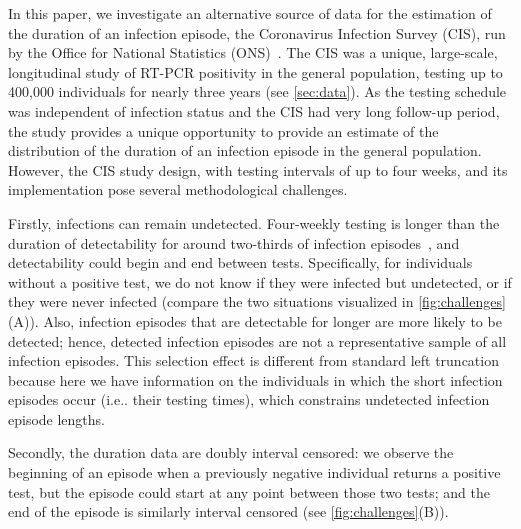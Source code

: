 \documentclass[referee,useAMS,usenatbib]{biom}
\makeatletter
\DeclareRobustCommand\onedot{\futurelet\@let@token\@onedot}
\def\@onedot{\ifx\@let@token.\else.\null\fi\xspace}
\def\ie{i.e\onedot} \def\Ie{{I.e}\onedot}
\makeatother
\begin{document}
In this paper, we investigate an alternative source of data for the estimation of the duration of an infection episode, the Coronavirus Infection Survey (CIS), run by the Office for National Statistics (ONS)~\citep{CIS}.
The CIS was a unique, large-scale, longitudinal study of RT-PCR positivity in the general population, testing up to 400,000 individuals for nearly three years (see \cref{sec:data}).
As the testing schedule was independent of infection status and the CIS had very long follow-up period, the study provides a unique opportunity to provide an estimate of the distribution of the duration of an infection episode in the general population.
However, the CIS study design, with testing intervals of up to four weeks, and its implementation pose several methodological challenges.

Firstly, infections can remain undetected.
Four-weekly testing is longer than the duration of detectability for around two-thirds of infection episodes~\citep{killingleySafety}, and detectability could begin and end between tests.
Specifically, for individuals without a positive test, we do not know if they were infected but undetected, or if they were never infected (compare the two situations visualized in \cref{fig:challenges}(A)).
Also, infection episodes that are detectable for longer are more likely to be detected; hence, detected infection episodes are not a representative sample of all infection episodes.
This selection effect is different from standard left truncation~\cite[e.g.][]{sunEmpirical,bacchettiNonparametric} because here we have information on the individuals in which the short infection episodes occur (\ie their testing times), which constrains undetected infection episode lengths.


Secondly, the duration data are doubly interval censored: we observe the beginning of an episode when a previously negative individual returns a positive test, but the episode could start at any point between those two tests; and the end of the episode is similarly interval censored (see \cref{fig:challenges}(B)).
\end{document}

